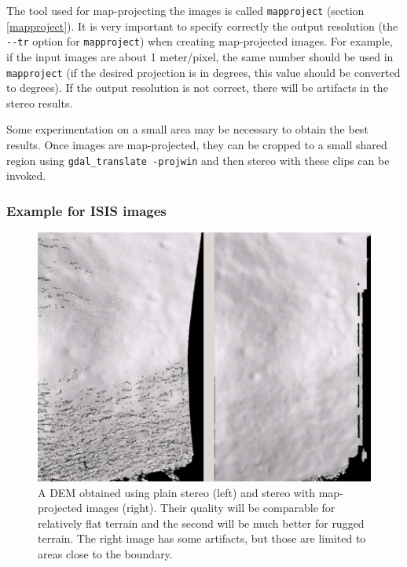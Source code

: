 The tool used for map-projecting the images is called
\texttt{mapproject} (section \ref{mapproject}). It is very important to
specify correctly the output resolution (the \texttt{-\/-tr} option for
\texttt{mapproject}) when creating map-projected images. For example, if
the input images are about 1 meter/pixel, the same number should be used
in \texttt{mapproject} (if the desired projection is in degrees, this
value should be converted to degrees). If the output resolution is not
correct, there will be artifacts in the stereo results.

Some experimentation on a small area may be necessary to obtain the best
results. Once images are map-projected, they can be cropped to a small
shared region using \texttt{gdal\_translate -projwin} and then 
stereo with these clips can be invoked. 

\subsubsection{Example for ISIS images}

\begin{figure}[h!]
\centering
   \includegraphics[width=6.0in]{images/stereo_mapproj_400px.png}
\caption{A DEM obtained using plain stereo (left) and stereo
  with map-projected images (right). Their quality will be comparable
  for relatively flat terrain and the second will be much better for
  rugged terrain. The right image has some artifacts, but those are limited
  to areas close to the boundary.}
\label{fig:mapproj-example}
\end{figure}

